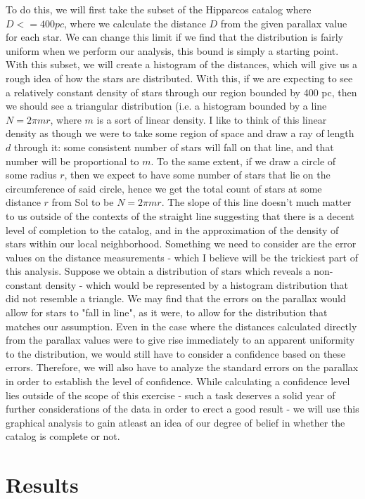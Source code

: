 \documentclass{business-covered} %
\begin{document}
		To do this, we will first take the subset of the Hipparcos catalog where $D<=400 pc$, where we calculate the distance $D$ from the given parallax value for each star. We can change this limit if we find that the distribution is fairly uniform when we perform our analysis, this bound is simply a starting point. 
		With this subset, we will create a histogram of the distances, which will give us a rough idea of how the stars are distributed. With this, if we are expecting to see a relatively constant density of stars through our region bounded by 400 pc, then we should see a triangular distribution (i.e. a histogram bounded by a line $N=2\pi mr$, where $m$ is a sort of linear density. I like to think of this linear density as though we were to take some region of space and draw a ray of length $d$ through it: some consistent number of stars will fall on that line, and that number will be proportional to $m$. To the same extent, if we draw a circle of some radius $r$, then we expect to have some number of stars that lie on the circumference of said circle, hence we get the total count of stars at some distance $r$ from Sol to be $N=2\pi mr$.
		The slope of this line doesn't much matter to us outside of the contexts of the straight line suggesting that there is a decent level of completion to the catalog, and in the approximation of the density of stars within our local neighborhood.  		
		Something we need to consider are the error values on the distance measurements - which I believe will be the trickiest part of this analysis. Suppose we obtain a distribution of stars which reveals a non-constant density - which would be represented by a histogram distribution that did not resemble a triangle. We may find that the errors on the parallax would allow for stars to "fall in line", as it were, to allow for the distribution that matches our assumption. Even in the case where the distances calculated directly from the parallax values were to give rise immediately to an apparent uniformity to the distribution, we would still have to consider a confidence based on these errors. Therefore, we will also have to analyze the standard errors on the parallax in order to establish the level of confidence. While calculating a confidence level lies outside of the scope of this exercise - such a task deserves a solid year of further considerations of the data in order to erect a good result - we will use this graphical analysis to gain atleast an idea of our degree of belief in whether the catalog is complete or not.
		
\pagebreak
	\section{Results}
	
\end{document}
